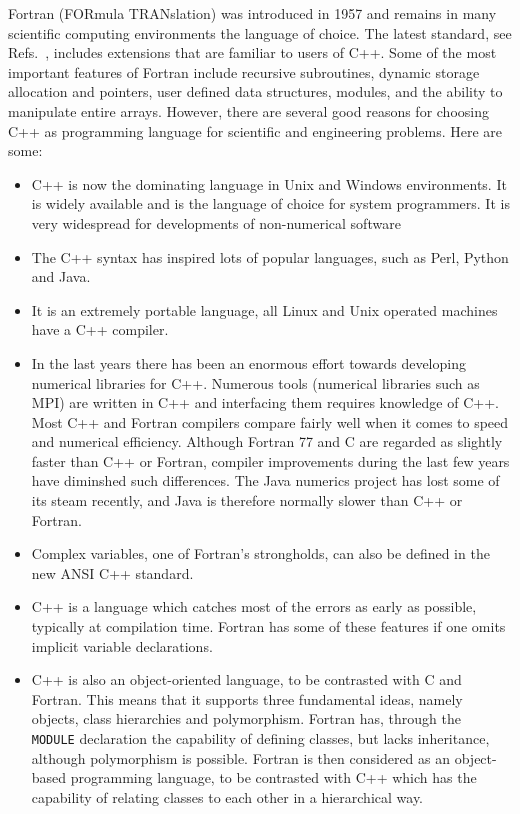 Fortran (FORmula TRANslation) was introduced in 1957 and remains in many 
scientific computing environments the language of choice.
The latest standard, see Refs.~\cite{f95ref,metcalf1996,marshall1995,f2003}, 
includes extensions that are
familiar to users of C++. 
Some of the most important features of Fortran  include recursive
subroutines, dynamic storage allocation and pointers, 
user defined data structures, modules,
and the ability to manipulate entire arrays. 
However, there are several good reasons for 
choosing C++ as programming language for scientific and engineering
problems. Here are some:
\begin{itemize}
\item C++ is now the dominating language in Unix and Windows environments. It is widely available and is
the language of choice for system programmers.  It is very widespread for developments of non-numerical  software 
\item The C++ syntax has inspired lots of popular languages, such as Perl, Python and Java.
\item It is an extremely portable language, all Linux and Unix operated machines have a 
C++ compiler.
\item In the last years there has been an enormous effort towards developing numerical libraries
for C++. Numerous tools (numerical libraries such as MPI\cite{gropp1999,mpiref,cmpi}) are written in C++
and interfacing them requires knowledge of C++. 
Most C++ and Fortran compilers compare fairly well when it comes to speed and
numerical efficiency. Although Fortran 77 and C are regarded as slightly faster than C++ or Fortran,
compiler improvements during the last few years have diminshed such differences. The Java numerics project
has lost some of its steam recently, and Java is therefore normally slower than C++ or Fortran.
\item Complex variables, one of Fortran's strongholds, can also be defined in the new 
ANSI C++ standard. 
\item C++ is a language which catches most of the errors as early as possible, typically at compilation
time. Fortran has some of these features if one omits implicit variable declarations.
\item C++ is also an object-oriented language, to be contrasted with C and Fortran.
This means that it supports three fundamental ideas, namely objects, class hierarchies and polymorphism.
Fortran has, through the \verb? MODULE?  declaration the capability of defining classes, but lacks 
inheritance, although polymorphism is possible. Fortran is then considered as an object-based
programming language, to be contrasted with C++ which has the capability of relating classes
to each other in a hierarchical way.
\end{itemize}


